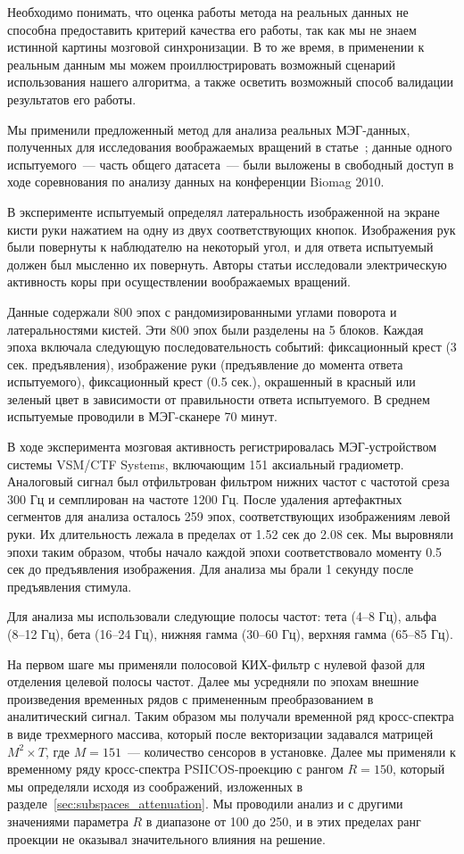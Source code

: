 Необходимо понимать, что оценка работы метода на
реальных данных не способна предоставить критерий качества его работы, так как
мы не знаем истинной картины мозговой синхронизации. В то же время, в применении к реальным данным
мы можем проиллюстрировать возможный сценарий использования нашего алгоритма,
а также осветить возможный способ валидации результатов его работы.

Мы применили предложенный метод для анализа реальных МЭГ-данных, полученных для
исследования воображаемых вращений в статье~\cite{DeLange2008}; данные одного
испытуемого~--- часть общего датасета~--- были выложены в свободный доступ в
ходе соревнования по анализу данных на конференции Biomag 2010.

В эксперименте испытуемый определял латеральность изображенной на экране кисти
руки нажатием на одну из двух соответствующих кнопок. Изображения рук были
повернуты к наблюдателю на некоторый угол, и для ответа испытуемый должен был
мысленно их повернуть. Авторы статьи исследовали электрическую активность коры
при осуществлении воображаемых вращений.

Данные содержали 800 эпох с рандомизированными углами поворота и
латеральностями кистей. Эти 800 эпох были разделены на 5 блоков. Каждая эпоха включала
следующую последовательность событий: фиксационный крест (3 сек. предъявления),
изображение руки (предъявление до момента ответа испытуемого), фиксационный
крест (0.5 сек.), окрашенный в красный или зеленый цвет в зависимости от
правильности ответа испытуемого. В среднем испытуемые проводили в МЭГ-сканере
70 минут.

В ходе эксперимента мозговая активность регистрировалась МЭГ-устройством
системы VSM/CTF Systems, включающим 151 аксиальный градиометр. Аналоговый
сигнал был отфильтрован  фильтром нижних частот с частотой среза 300 Гц и
семплирован на частоте 1200 Гц. После удаления артефактных сегментов для
анализа осталось 259 эпох, соответствующих изображениям левой руки. Их
длительность лежала в пределах от 1.52 сек до 2.08 сек. Мы выровняли эпохи
таким образом, чтобы начало каждой эпохи соответствовало моменту 0.5 сек до
предъявления изображения. Для анализа мы брали 1 секунду после предъявления
стимула.

Для анализа мы использовали следующие полосы частот: тета (4--8 Гц), альфа
(8--12 Гц), бета (16--24 Гц), нижняя гамма (30--60 Гц), верхняя гамма (65--85
Гц).

На первом шаге мы применяли полосовой КИХ-фильтр с нулевой фазой для отделения
целевой полосы частот. Далее мы усредняли по эпохам внешние произведения
временных рядов с примененным преобразованием в аналитический сигнал. Таким
образом мы получали временной ряд кросс-спектра в виде трехмерного массива,
который после векторизации задавался матрицей $M^2 \times T$, где $M=151$~---
количество сенсоров в установке. Далее мы применяли к временному ряду
кросс-спектра PSIICOS-проекцию с рангом $R=150$, который мы определяли исходя
из соображений, изложенных в разделе~\ref{sec:subspaces_attenuation}. Мы
проводили анализ и с другими значениями параметра $R$ в диапазоне от 100 до
250, и в этих пределах ранг проекции не оказывал значительного влияния на
решение.

